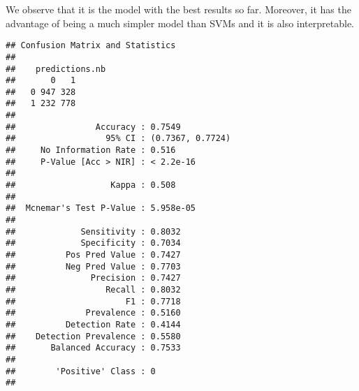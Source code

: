 \documentclass[
]{article}
\newenvironment{Shaded}{\begin{snugshade}}{\end{snugshade}}
\newcommand{\AttributeTok}[1]{\textcolor[rgb]{0.77,0.63,0.00}{#1}}
\newcommand{\DecValTok}[1]{\textcolor[rgb]{0.00,0.00,0.81}{#1}}
\newcommand{\FunctionTok}[1]{\textcolor[rgb]{0.00,0.00,0.00}{#1}}
\newcommand{\NormalTok}[1]{#1}
\newcommand{\OtherTok}[1]{\textcolor[rgb]{0.56,0.35,0.01}{#1}}
\newcommand{\SpecialCharTok}[1]{\textcolor[rgb]{0.00,0.00,0.00}{#1}}
\newcommand{\StringTok}[1]{\textcolor[rgb]{0.31,0.60,0.02}{#1}}
\begin{document}
We observe that it is the model with the best results so far. Moreover,
it has the advantage of being a much simpler model than SVMs and it is
also interpretable.

\begin{Shaded}
\end{Shaded}

\begin{verbatim}
## Confusion Matrix and Statistics
## 
##    predictions.nb
##       0   1
##   0 947 328
##   1 232 778
##                                           
##                Accuracy : 0.7549          
##                  95% CI : (0.7367, 0.7724)
##     No Information Rate : 0.516           
##     P-Value [Acc > NIR] : < 2.2e-16       
##                                           
##                   Kappa : 0.508           
##                                           
##  Mcnemar's Test P-Value : 5.958e-05       
##                                           
##             Sensitivity : 0.8032          
##             Specificity : 0.7034          
##          Pos Pred Value : 0.7427          
##          Neg Pred Value : 0.7703          
##               Precision : 0.7427          
##                  Recall : 0.8032          
##                      F1 : 0.7718          
##              Prevalence : 0.5160          
##          Detection Rate : 0.4144          
##    Detection Prevalence : 0.5580          
##       Balanced Accuracy : 0.7533          
##                                           
##        'Positive' Class : 0               
## 
\end{verbatim}
\end{document}
